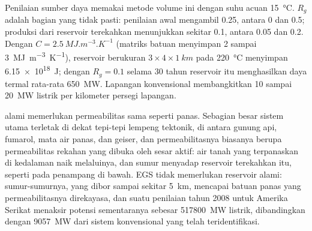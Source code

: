 Penilaian sumber daya memakai metode volume ini dengan suhu acuan \qty{15}{\celsius}.  $R_g$ adalah bagian yang tidak pasti: penilaian awal mengambil 0.25, antara 0 dan 0.5; produksi dari
reservoir terekahkan menunjukkan sekitar 0.1, antara 0.05 dan 0.2. Dengan $C = \qty{2.5}{MJ.m^{-3}.K^{-1}}$
(matriks batuan menyimpan 2 sampai \qty{3}{MJ.m^{-3}.K^{-1}}), reservoir berukuran $3 \times 4 \times
\qty{1}{km}$ pada \qty{220}{\celsius} menyimpan \qty{6.15e18}{J}; dengan $R_g = 0.1$ selama 30 tahun reservoir itu
menghasilkan daya termal rata-rata \qty{650}{MW}. Lapangan konvensional membangkitkan 10 sampai
\qty{20}{MW} listrik per kilometer persegi lapangan.

 alami memerlukan permeabilitas sama seperti panas. Sebagian besar sistem utama terletak di dekat
tepi-tepi lempeng tektonik, di antara gunung api, fumarol, mata air panas, dan geiser, dan
permeabilitasnya biasanya berupa permeabilitas rekahan yang dibuka oleh sesar aktif: air tanah yang terpanaskan di kedalaman
naik melaluinya, dan sumur menyadap reservoir terekahkan itu, seperti pada penampang di bawah. EGS tidak memerlukan reservoir alami:
sumur-sumurnya, yang dibor sampai sekitar \qty{5}{km}, mencapai batuan panas yang permeabilitasnya direkayasa, dan
suatu penilaian tahun 2008 untuk Amerika Serikat menaksir potensi sementaranya sebesar \qty{517800}{MW}
listrik, dibandingkan dengan \qty{9057}{MW} dari sistem konvensional yang telah teridentifikasi.

